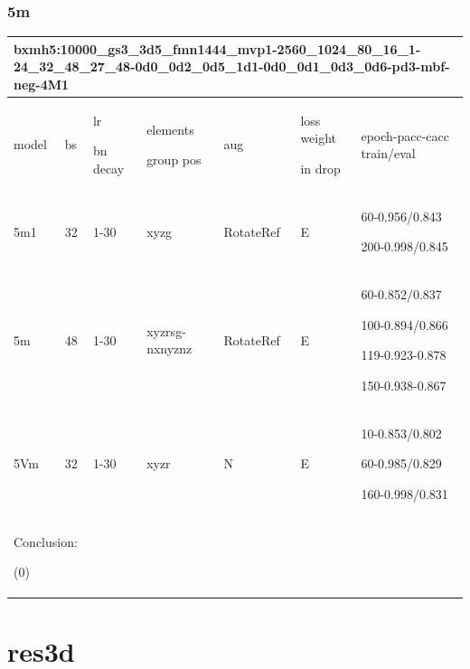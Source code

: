 \documentclass[,table,dvipsnames]{article}
\begin{document}
\subsubsection{5m}
\noindent
\begin{tabular}{|p{1.5cm}|p{1.5cm}|p{1cm}|p{1.5cm}|p{1.5cm}|p{1.5cm}|p{5cm}| }
	\hline
	\multicolumn{7}{|p{14cm}|}{bxmh5:10000\_gs3\_3d5\_fmn1444\_mvp1-2560\_1024\_80\_16\_1-24\_32\_48\_27\_48-0d0\_0d2\_0d5\_1d1-0d0\_0d1\_0d3\_0d6-pd3-mbf-neg-4M1\par 
		 }\\
	\hline
	model & bs& lr\par bn decay & elements\par group pos & aug & loss weight\par in drop & epoch-pacc-cacc train/eval \\
	\hline
	
	5m1 & 32 & 1-30 & xyzg & RotateRef & E & 60-0.956/0.843\par 200-0.998/0.845\\
	\hline 
	5m & 48 & 1-30 & xyzrsg-nxnyznz & RotateRef & E & 60-0.852/0.837\par 100-0.894/0.866\par 119-0.923-0.878\par 150-0.938-0.867\\
	\hline 
	5Vm & 32 & 1-30 & xyzr & N & E &10-0.853/0.802\par 60-0.985/0.829\par 160-0.998/0.831\\
	\hline 
	\multicolumn{7}{|p{16cm}|}{ Conclusion:\par	
		(0)  } \\
	\hline	
\end{tabular}

\section{res3d}
\end{document}

